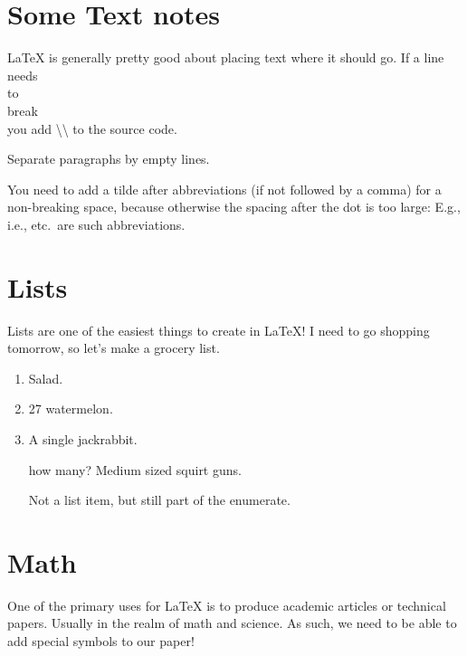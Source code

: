 \documentclass[12pt]{article}
\begin{document}
\section{Some Text notes}
\LaTeX{} is generally pretty good about placing text where it should
go. If
a line \\ needs \\ to \\ break \\ you add \textbackslash\textbackslash{}
to the source code.

Separate paragraphs by empty lines.

You need to add a tilde after abbreviations (if not followed by a comma) for a
non-breaking space, because otherwise the spacing after the dot is too large:
E.g., i.e., etc.~are such abbreviations.

\section{Lists}
Lists are one of the easiest things to create in \LaTeX! I need to go shopping
tomorrow, so let's make a grocery list.
\begin{enumerate} %
  \item Salad.
  \item 27 watermelon.
  \item A single jackrabbit.
  \item[how many?] Medium sized squirt guns.

  Not a list item, but still part of the enumerate.

\end{enumerate} %

\section{Math}

One of the primary uses for \LaTeX{} is to produce academic articles
or technical papers. Usually in the realm of math and science. As such,
we need to be able to add special symbols to our paper!
\end{document}
